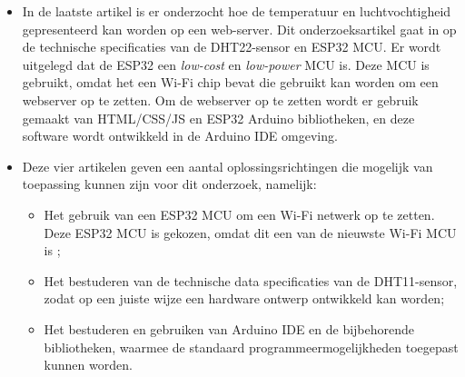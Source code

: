 \begin{itemize}
    \item[\ding{226}] In de laatste artikel \cite{macheso2021design} is er onderzocht hoe de temperatuur en luchtvochtigheid gepresenteerd kan worden op een web-server. 
Dit onderzoeksartikel gaat in op de technische specificaties van de DHT22-sensor en ESP32 MCU. 
Er wordt uitgelegd dat de ESP32 een \textit{low-cost} en \textit{low-power} MCU is. 
Deze MCU is gebruikt, omdat het een Wi-Fi chip bevat die gebruikt kan worden om een webserver op te zetten. 
Om de webserver op te zetten wordt er gebruik gemaakt van HTML/CSS/JS en ESP32 Arduino bibliotheken, en deze software wordt ontwikkeld in de Arduino IDE omgeving. 
\linebreak 
\item[\ding{226}] Deze vier artikelen geven een aantal oplossingsrichtingen die mogelijk van toepassing kunnen zijn voor dit onderzoek, namelijk:
\begin{itemize}
    \item Het gebruik van een ESP32 MCU om een Wi-Fi netwerk op te zetten. Deze ESP32 MCU is gekozen, omdat dit een van de nieuwste Wi-Fi MCU is \cite{esp2313};
    \item Het bestuderen van de technische data specificaties van de DHT11-sensor, zodat op een juiste wijze een hardware ontwerp ontwikkeld kan worden;
    \item Het bestuderen en gebruiken van Arduino IDE en de bijbehorende bibliotheken, waarmee de standaard programmeermogelijkheden toegepast kunnen worden.
\end{itemize}
\end{itemize}
